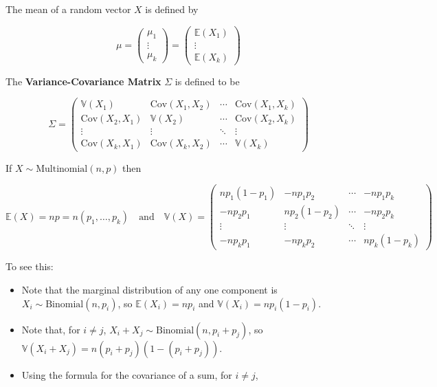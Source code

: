 The mean of a random vector \(X\) is defined by

\[ \mu = \begin{pmatrix} \mu_{1} \\ \vdots \\ \mu_{k} \end{pmatrix} = \begin{pmatrix} \mathbb{E}(X_{1}) \\ \vdots \\ \mathbb{E}(X_{k}) \end{pmatrix} \]

The \textbf{Variance-Covariance Matrix} \(\Sigma\) is defined to be

\[ \Sigma = \begin{pmatrix}
\mathbb{V}(X_{1}) & \text{Cov}(X_{1}, X_{2}) & \cdots & \text{Cov}(X_{1}, X_{k}) \\
\text{Cov}(X_{2}, X_{1}) & \mathbb{V}(X_{2}) & \cdots & \text{Cov}(X_{2}, X_{k}) \\
\vdots & \vdots & \ddots & \vdots \\
\text{Cov}(X_{k}, X_{1}) & \text{Cov}(X_{k}, X_{2}) & \cdots & \mathbb{V}(X_{k})
\end{pmatrix} \]

If \(X \sim \text{Multinomial}(n, p)\) then

\[ 
\mathbb{E}(X) = np = n(p_{1}, \dots, p_{k})
\quad \text{and} \quad
\mathbb{V}(X) = \begin{pmatrix}
np_{1}(1 - p_{1}) & -np_{1}p_{2} & \cdots & -np_{1}p_{k} \\
-np_{2}p_{1} & np_{2}(1 - p_{2}) & \cdots & -np_{2}p_{k} \\
\vdots & \vdots & \ddots & \vdots \\
-np_{k}p_{1} & -np_{k}p_{2} & \cdots & np_{k}(1 - p_{k})
\end{pmatrix} \]

To see this:

\begin{itemize}[tightlist]
\item
  Note that the marginal distribution of any one component is
  \(X_{i} \sim \text{Binomial}(n, p_{i})\), so \(\mathbb{E}(X_{i}) = np_{i}\)
  and \(\mathbb{V}(X_{i}) = np_{i}(1 - p_{i})\).\\
\item
  Note that, for \(i \neq j\),
  \(X_{i} + X_{j} \sim \text{Binomial}(n, p_{i} + p_{j})\), so
  \(\mathbb{V}(X_{i} + X_{j}) = n(p_{i} + p_{j})(1 - (p_{i} + p_{j}))\).
\item
  Using the formula for the covariance of a sum, for \(i \neq j\),
\end{itemize}

